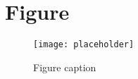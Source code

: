 \documentclass[11pt,fleqn,oneside,openany]{book} %
\begin{document}

\section{Figure}

\begin{figure}[h]
\centering\texttt{[image: placeholder]}
\caption{Figure caption}
\end{figure}






\end{document}
